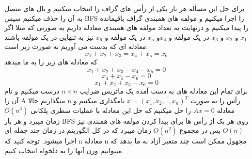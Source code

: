 \problem{}
برای حل این مسأله هر بار یکی از رأس های گراف را انتخاب میکنیم
و یال های متصل به آن را حذف میکنیم
سپس BFS را اجرا میکنیم و مولفه های همبندی 
گراف باقیمانده را پیدا میکنیم و درنهایت
به تعداد مولفه های همبندی 
معادله داریم
به صورتی که مثلا اگر $x_1$ و $x_2$ و $x_3$
در یک مولفه و $x_4$و $x_5$ در یک مولفه
و $x_6$ نیز به تنهایی در یک مولفه باشند
معادله ای که بدست می آوریم به صورت زیر است:\\
\[
    x_1+x_2+x_3 = x_4+x_5 = x_6  
\]
که معادله های زیر را به ما میدهد
\[
  x_1+x_2+x_3-x_4-x_5 = 0
\]
\[
  x_4+x_5-x_6 = 0
\]
\[
  x_1+x_2+x_3-x_6 = 0  
\]
برای تمام این معادله های به دست آمده
یک ماتریس ضرایب $n\times n$
درست میکنیم و نام آن را A میگذاریم
حالا n رأس را به صورت $x = (x_1,x_2,..,x_n)^T$ 
نامگذاری میکنیم و معادله $Ax = 0$ را حل میکنیم
که حل این معادله با عملیات سطری پلکانی
$O(n^3)$ زمان میبرد
و هر بار BFS روی هر یک از رأس ها برای پیدا کردن مولفه های همبندی نیز 
$O(n)$ پس در مجموع $O(n^2)$ زمان میبرد که در کل الگوریتم
در زمان چند جمله ای اجرا میشود.
توجه کنید که n معادله n مجهول ممکن است چند متغیر آزاد به ما بدهد
که میتوانیم وزن آنها را به دلخواه انتخاب کنیم.
